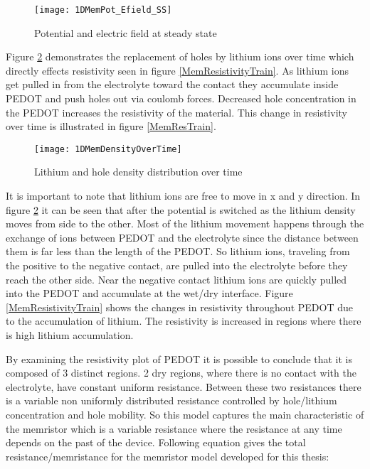 \begin{doublespace}
\begin{figure}[!htp]
\centering
\texttt{[image: 1DMemPot\_Efield\_SS]}
\caption{Potential and electric field at steady state} 
\label{MemEss}
\end{figure}

Figure \ref{MempLi} demonstrates the replacement of holes by lithium ions over time which directly effects resistivity seen in figure \ref{MemResistivityTrain}.  As lithium ions get pulled in from the electrolyte toward the contact they accumulate inside PEDOT and push holes out via coulomb forces. Decreased hole concentration in the PEDOT increases the resistivity of the material. This change in resistivity over time is illustrated in figure \ref{MemResTrain}.

\begin{figure}[!htp]
\centering
\texttt{[image: 1DMemDensityOverTime]}
\caption{Lithium and hole density distribution over time} 
\label{MempLi}
\end{figure}

It is important to note that lithium ions are free to move in x and y direction. In figure \ref{MempLi} it can be seen that after the potential is switched as the lithium density moves from  side to the other. Most of the lithium movement happens through the exchange of ions between PEDOT and the electrolyte since the distance between them is far less than the length of the PEDOT. So lithium ions, traveling from the positive to the negative contact, are pulled into the electrolyte before they reach the other side. Near the negative contact lithium ions are quickly pulled into the PEDOT and accumulate at the wet/dry interface. Figure \ref{MemResistivityTrain} shows the changes in resistivity throughout PEDOT due to the accumulation of lithium. The resistivity is increased in regions where there is high lithium accumulation. 

By examining the resistivity plot of PEDOT it is possible to conclude that it is composed of 3 distinct regions. 2 dry regions, where there is no contact with the electrolyte, have constant uniform resistance. Between these two resistances there is a variable non uniformly distributed resistance controlled by hole/lithium concentration and hole mobility. So this model captures the main characteristic of the memristor which is a variable resistance where the resistance at any time depends on the past of the device. Following equation gives the total resistance/memristance for the memristor model developed for this thesis:


\end{doublespace}
